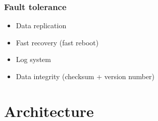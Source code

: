 \documentclass{beamer}
\begin{document}
\begin{frame}
 \frametitle{}
\end{frame}

\begin{frame}
 \frametitle{Fault tolerance}
 \begin{itemize}
  \item \alert{Data replication}
  \item \alert{Fast recovery} (fast reboot)
  \item \alert{Log system}
  \item \alert{Data integrity} (checksum + version number)
 \end{itemize}
\end{frame}

\section{Architecture}
\end{document}
